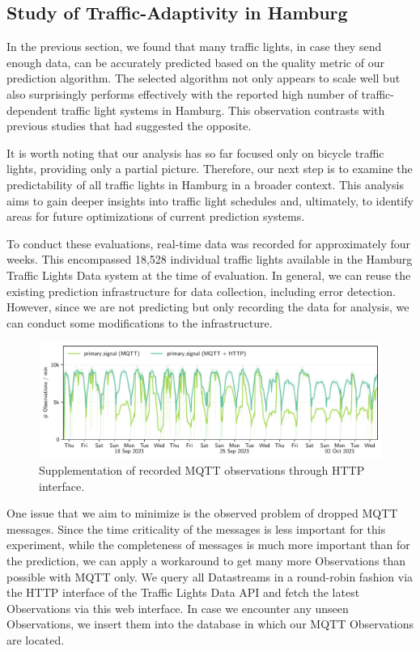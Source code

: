 \subsection{Study of Traffic-Adaptivity in Hamburg}

In the previous section, we found that many traffic lights, in case they send enough data, can be accurately predicted based on the quality metric of our prediction algorithm. The selected algorithm not only appears to scale well but also surprisingly performs effectively with the reported high number of traffic-dependent traffic light systems in Hamburg. This observation contrasts with previous studies that had suggested the opposite.

It is worth noting that our analysis has so far focused only on bicycle traffic lights, providing only a partial picture. Therefore, our next step is to examine the predictability of all traffic lights in Hamburg in a broader context. This analysis aims to gain deeper insights into traffic light schedules and, ultimately, to identify areas for future optimizations of current prediction systems.

To conduct these evaluations, real-time data was recorded for approximately four weeks. This encompassed 18,528 individual traffic lights available in the Hamburg Traffic Lights Data system at the time of evaluation. In general, we can reuse the existing prediction infrastructure for data collection, including error detection. However, since we are not predicting but only recording the data for analysis, we can conduct some modifications to the infrastructure.

\begin{figure}[t]
    \centering
    \includegraphics[width=\linewidth]{images/adaptiveness-mqtt-http.pdf}
    \caption{Supplementation of recorded MQTT observations through HTTP interface.}\label{fig:adaptiveness-mqtt-http}
\end{figure}

One issue that we aim to minimize is the observed problem of dropped MQTT messages. Since the time criticality of the messages is less important for this experiment, while the completeness of messages is much more important than for the prediction, we can apply a workaround to get many more Observations than possible with MQTT only. We query all Datastreams in a round-robin fashion via the HTTP interface of the Traffic Lights Data API and fetch the latest Observations via this web interface. In case we encounter any unseen Observations, we insert them into the database in which our MQTT Observations are located. 

